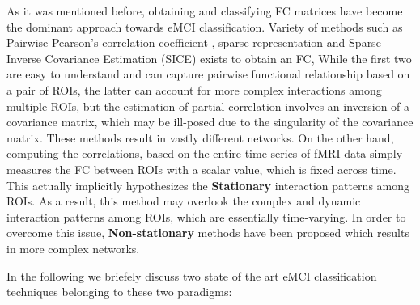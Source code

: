 \documentclass[journal]{IEEEtran}
\begin{document}
%	
	As it was mentioned before, obtaining and classifying FC matrices have become the dominant approach towards eMCI classification. 
	Variety of methods such as Pairwise Pearson’s correlation coefficient \cite{r10, r11}, sparse representation \cite{r10, r12, r13}  and Sparse Inverse Covariance Estimation (SICE)\cite{r15} exists to obtain an FC,
	While the first two are easy to understand and can capture pairwise functional relationship based on a pair of ROIs, the latter can account for more complex interactions among multiple ROIs, but the estimation of partial correlation involves an inversion of a covariance matrix, which may be ill-posed due to the singularity of the covariance matrix. 
	These methods result in vastly different networks\cite{r35}. On the other hand, computing the correlations, based on the entire time series of fMRI data simply measures the FC between ROIs with a scalar value, which is fixed across time. This actually implicitly hypothesizes the \textbf{Stationary} interaction patterns among ROIs. As a result, this method may overlook the complex and dynamic interaction patterns among ROIs, which are essentially time-varying. In order to overcome this issue, \textbf{Non-stationary} methods have been proposed which results in more complex networks\cite{r16}\textendash \cite{r19}.
		
	
	In the following we briefely discuss two state of the art eMCI classification techniques belonging to these two paradigms:
	
\end{document}
